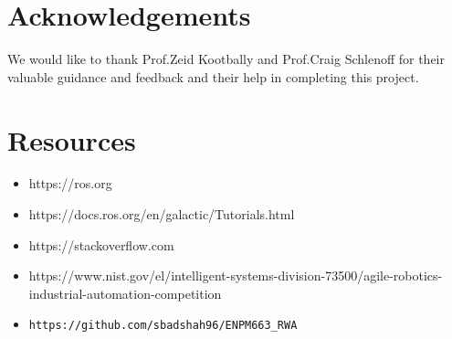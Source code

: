 \documentclass{uva-inf-article}
\begin{document}
\justifying
\section{Acknowledgements}
We would like to thank Prof.Zeid Kootbally and Prof.Craig Schlenoff for their valuable guidance and feedback and their help in completing this project.
\section{Resources}
\begin{itemize}
    \item https://ros.org
    \item https://docs.ros.org/en/galactic/Tutorials.html
    \item https://stackoverflow.com
    \item https://www.nist.gov/el/intelligent-systems-division-73500/agile-robotics-industrial-automation-competition
    \item \verb|https://github.com/sbadshah96/ENPM663_RWA|
\end{itemize}

\printbibliography
\end{document}
